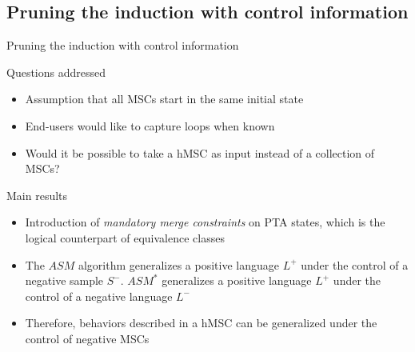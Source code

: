 \subsection{Pruning the induction with control information}
\begin{frame}{Pruning the induction with control information}
	\begin{block}{Questions addressed}
		\begin{itemize}
			\item Assumption that all MSCs start in the same initial state
			\item End-users would like to capture loops when known
			\item Would it be possible to take a hMSC as input instead of a collection of MSCs?
		\end{itemize}
	\end{block}
	\begin{block}{Main results}
		\begin{itemize}
			\item Introduction of \emph{mandatory merge constraints} on PTA states, which is the logical counterpart
				of equivalence classes
			\item The $ASM$ algorithm generalizes a positive language $L^+$ under the control of a negative sample $S^-$. 
			          $ASM^*$ generalizes a positive language $L^+$ under the control of a negative language $L^-$
			\item Therefore, behaviors described in a hMSC can be generalized under the control of negative MSCs 
		\end{itemize}
	\end{block}
\end{frame}

